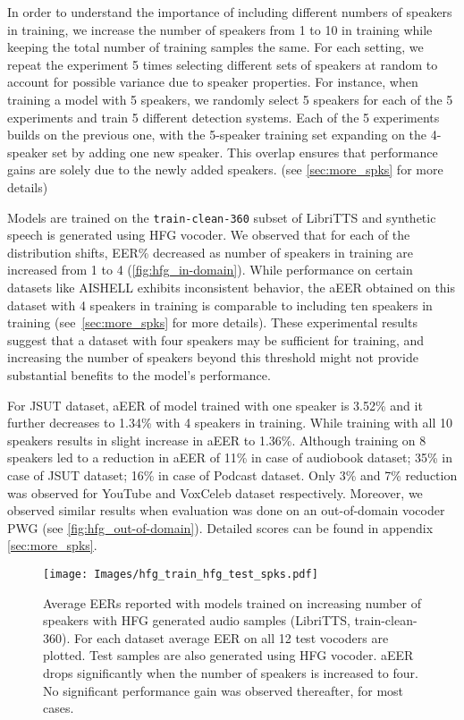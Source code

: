 In order to understand the importance of including different numbers of speakers in training, we increase the number of speakers from 1 to 10 in training while keeping the total number of training samples the same. For each setting, we repeat the experiment 5 times selecting different sets of speakers at random to account for possible variance due to speaker properties. For instance, when training a model with 5 speakers, we randomly select 5 speakers for each of the 5 experiments and train 5 different detection systems. Each of the 5 experiments builds on the previous one, with the 5-speaker training set expanding on the 4-speaker set by adding one new speaker. This overlap ensures that performance gains are solely due to the newly added speakers. (see \autoref{sec:more_spks} for more details) 

Models are trained on the \texttt{train-clean-360} subset of LibriTTS and synthetic speech is generated using HFG vocoder. We observed that for each of the distribution shifts, EER\% decreased as number of speakers in training are increased from 1 to 4 (\autoref{fig:hfg_in-domain}). While performance on certain datasets like AISHELL exhibits inconsistent behavior, the aEER obtained on this dataset with 4 speakers in training is comparable to including ten speakers in training (see~\autoref{sec:more_spks} for more details). These experimental results suggest that a dataset with four speakers may be sufficient for training, and increasing the number of speakers beyond this threshold might not provide substantial benefits to the model’s performance. 

For JSUT dataset, aEER of model trained with one speaker is 3.52\% and it further decreases to 1.34\% with 4 speakers in training. While training with all 10 speakers results in slight increase in aEER to 1.36\%. Although training on 8 speakers led to a reduction in aEER of 11\% in case of audiobook dataset; 35\% in case of JSUT dataset; 16\% in case of Podcast dataset. Only 3\% and 7\% reduction was observed for YouTube and VoxCeleb dataset respectively. Moreover, we observed similar results when evaluation was done on an out-of-domain vocoder PWG (see \autoref{fig:hfg_out-of-domain}). Detailed scores can be found in appendix \autoref{sec:more_spks}.

\begin{figure}[t]
\vskip 0.2in 
\begin{center}
\centerline{\texttt{[image: Images/hfg\_train\_hfg\_test\_spks.pdf]}}
    \caption{Average EERs reported with models trained on increasing number of speakers with HFG generated audio samples (LibriTTS, train-clean-360). For each dataset average EER on all 12 test vocoders are plotted. Test samples are also generated using HFG vocoder. aEER drops significantly when the number of speakers is increased to four. No significant performance gain was observed thereafter, for most cases.}
     \label{fig:hfg_in-domain}
\end{center}
\vskip -0.2in 
\end{figure}
